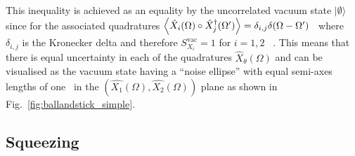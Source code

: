 This inequality is achieved as an equality by the uncorrelated vacuum state $\lvert\emptyset\rangle$ since for the associated quadratures $\ev{\hat{X}_i(\Omega)\circ\hat{X}_j^\dag(\Omega')}=\delta_{i,j}\delta(\Omega-\Omega')$~\cite{} where $\delta_{i,j}$ is the Kronecker delta and therefore $S_{X_i}^\text{vac}=1$ for $i=1,2$~\cite{danilishinQuantumMeasurementTheory2012} . This means that there is equal uncertainty in each of the quadratures $\hat{X}_\theta(\Omega)$ and can be visualised as the vacuum state having a ``noise ellipse'' with equal semi-axes lengths of one~\cite{} in the $(\hat{X_1}(\Omega),\hat{X_2}(\Omega))$ plane as shown in Fig.~\ref{fig:ballandstick_simple}.




\subsection{Squeezing}
\label{sec:squeezing_background}

